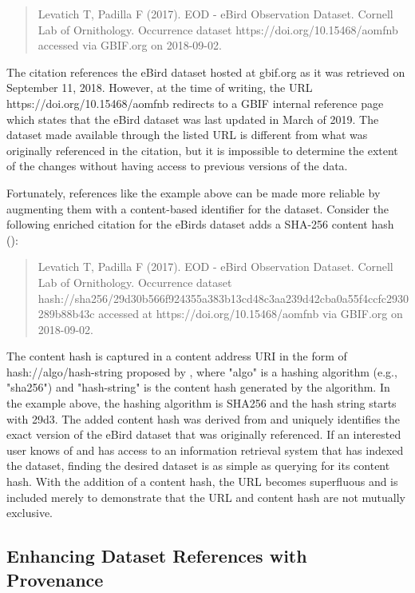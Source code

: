 \documentclass[10pt,letterpaper]{article}
\begin{document}
\begin{quote}
    Levatich T, Padilla F (2017). EOD - eBird Observation Dataset. Cornell Lab of Ornithology. Occurrence dataset https://doi.org/10.15468/aomfnb accessed via GBIF.org on 2018-09-02.
\end{quote}

The citation references the eBird dataset hosted at gbif.org as it was retrieved on September 11, 2018. However, at the time of writing, the URL https://doi.org/10.15468/aomfnb redirects to a GBIF internal reference page which states that the eBird dataset was last updated in March of 2019. The dataset made available through the listed URL is different from what was originally referenced in the citation, but it is impossible to determine the extent of the changes without having access to previous versions of the data.

Fortunately, references like the example above can be made more reliable by augmenting them with a content-based identifier for the dataset. Consider the following enriched citation for the eBirds dataset adds a SHA-256 content hash (\cite{SHA2_2001}):

\begin{quote}
    Levatich T, Padilla F (2017). EOD - eBird Observation Dataset. Cornell Lab of Ornithology. Occurrence dataset hash://sha256/29d30b566f924355a383b13cd48c3aa239d42cba0a55f4ccfc2930289b88b43c accessed at https://doi.org/10.15468/aomfnb via GBIF.org on 2018-09-02.
\end{quote}

The content hash is captured in a content address URI in the form of hash://algo/hash-string proposed by \cite{Trask_2015}, where "algo" is a hashing algorithm (e.g., "sha256") and "hash-string" is the content hash generated by the algorithm. In the example above, the hashing algorithm is SHA256 and the hash string starts with 29d3. The added content hash was derived from and uniquely identifies the exact version of the eBird dataset that was originally referenced. If an interested user knows of and has access to an information retrieval system that has indexed the dataset, finding the desired dataset is as simple as querying for its content hash. With the addition of a content hash, the URL becomes superfluous and is included merely to demonstrate that the URL and content hash are not mutually exclusive.

\subsection*{Enhancing Dataset References with Provenance}
\end{document}
